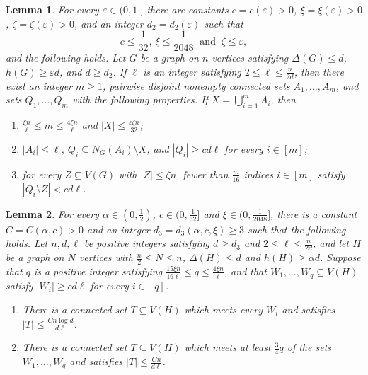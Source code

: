 \documentclass[10pt,a4paper]{amsart}
\newtheorem{lemma}{Lemma}
\newcommand{\eps}{\varepsilon}
\begin{document}
\begin{lemma}\label{lem:stable-branches}
For every $\eps\in(0,1]$, there are constants
$c=c(\eps)>0$, $\xi=\xi(\eps)>0$, $\zeta=\zeta(\eps)>0$, and an
integer $d_2=d_2(\eps)$ such that 
\[
c\le\frac{1}{32}, \
\xi\le\frac{1}{2048}\ \text{ and } \ \zeta\le\eps,
\]
and
the following holds. Let $G$ be a
graph on $n$ vertices satisfying $\Delta(G)\le d$,
$h(G)\ge\eps d$, and $d\ge d_2$. If $\ell$ is an integer satisfying
$2\le\ell\le\frac{n}{2d}$, then there exist an integer $m\ge1$, pairwise
disjoint nonempty connected sets $A_1,\ldots,A_m$, and sets
$Q_1,\ldots,Q_m$ with the following properties. If
$X=\bigcup_{i=1}^mA_i$, then
\begin{enumerate}[label=\textup{(\roman*)}]
 \item $\frac{\xi n}{\ell}\le m\le\frac{4\xi n}{\ell}$ and
       $|X|\le\frac{\eps\zeta n}{32}$;
 \item $|A_i|\le\ell$, $Q_i\subseteq N_G(A_i)\setminus X$, and
       $|Q_i|\ge cd\ell$ for every $i\in[m]$;
 \item for every $Z\subseteq V(G)$ with $|Z|\le\zeta n$, fewer than
       $\frac{m}{16}$ indices $i\in[m]$ satisfy
       $|Q_i\setminus Z|<cd\ell$.
\end{enumerate}

\end{lemma}

\begin{lemma}\label{lem:scale-hitting}
For every $\alpha\in(0,\frac{1}{2})$, $c\in(0, \frac{1}{32}]$ and
$\xi\in(0,\frac{1}{2048}]$, there is a constant $C=C(\alpha,c)>0$ and an
integer $d_3=d_3(\alpha,c,\xi)\ge3$ such that the following holds.
Let $n,d,\ell$ be positive integers satisfying $d\ge d_3$ and
$2\le\ell\le \frac{n}{2d}$, and let $H$ be a graph on $N$ vertices with
$\frac{n}{2}\le N\le n$, $\Delta(H)\le d$ and $h(H)\ge\alpha d$.
Suppose that $q$ is a positive integer satisfying
$\frac{15\xi n}{16\ell}\le q\le \frac{4\xi n}{\ell}$, and that
$W_1,\ldots,W_q\subseteq V(H)$ satisfy $|W_i|\ge cd\ell$ for
every $i\in[q]$.
\begin{enumerate}[label=\textup{(\alph*)}]
 \item There is a connected set $T\subseteq V(H)$ which
       meets every $W_i$ and satisfies
       $|T|\le \frac{Cn\log d}{d\ell}$.
 \item There is a connected set $T\subseteq V(H)$ which
       meets at least $\frac{3}{4}q$ of the sets $W_1,\ldots,W_q$ and
       satisfies $|T|\le \frac{Cn}{d\ell}$.
\end{enumerate}
\end{lemma}
\end{document}
